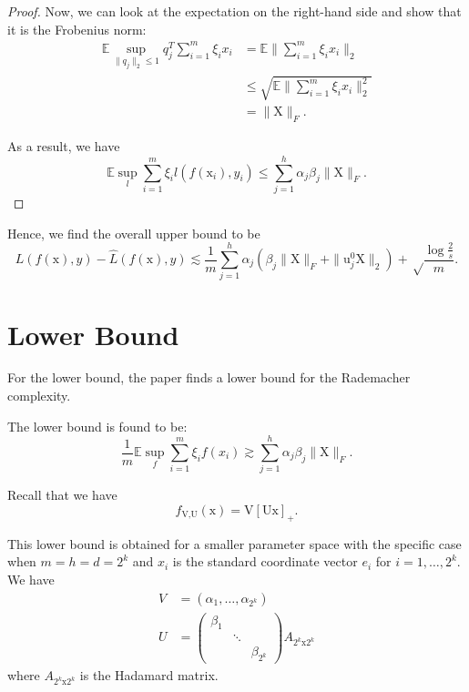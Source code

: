 \documentclass[twoside]{article}
\theoremstyle{definition}
\theoremstyle{definition}
\theoremstyle{remark}
\begin{document}
\begin{proof}
Now, we can look at the expectation on the right-hand side and show that it is the Frobenius norm:
\[
\begin{aligned}
\mathbb{E} \sup_{\| q_j \|_2 \leq 1} q_j^T \sum \limits_{i=1}^m \xi_i x_i &= \mathbb{E} \bigg\| \sum \limits_{i=1}^m \xi_i x_i \bigg \|_2 \\
&\leq \sqrt{\mathbb{E} \bigg\| \sum \limits_{i=1}^m \xi_i x_i \bigg \|_2^2} \\
&= \| \text{X} \|_F.
\end{aligned}
\]

As a result, we have
\[
\mathbb{E} \sup \limits_l \sum\limits_{i=1}^m \xi_i l(f(\text{x}_i),y_i) \leq \sum\limits_{j=1}^h \alpha_j \beta_j \| \text{X} \|_F.
\]

\end{proof}

Hence, we find the overall upper bound to be
\[
L(f(\text{x}),y) - \hat L(f(\text{x}),y) \lesssim \frac{1}{m} \sum\limits_{j=1}^h \alpha_j (\beta_j \| \text{X} \|_F + \| \text{u}_j^0 \text{X} \|_2) + \sqrt\frac{\log \frac{2}{s}}{m}.
\]

\section{Lower Bound}

For the lower bound, the paper finds a lower bound for the Rademacher complexity. 

The lower bound is found to be:
\begin{equation}
\frac{1}{m} \mathbb{E} \sup \limits_f \sum\limits_{i=1}^m \xi_i f(x_i) \gtrsim \sum\limits_{j=1}^h \alpha_j \beta_j \| \text{X} \|_F.
\end{equation}

Recall that we have
\[
f_\text{V,U}(\text{x})=\text{V}[\text{Ux}]_+.
\]

This lower bound is obtained for a smaller parameter space with the specific case when $m = h = d = 2^k$ and $x_i$ is the standard coordinate vector $e_i$ for $i = 1,\ldots,2^k$. We have
\[
\begin{aligned}
V &= (\alpha_1,\ldots,\alpha_{2^k}) \\
U &= \begin{pmatrix} 
\beta_1 & & \\
& \ddots & \\
& & \beta_{2^k}
\end{pmatrix}
A_{2^k \text{x} 2^k}
\end{aligned}
\]
where $A_{2^k \text{x} 2^k}$ is the Hadamard matrix.
\end{document}
